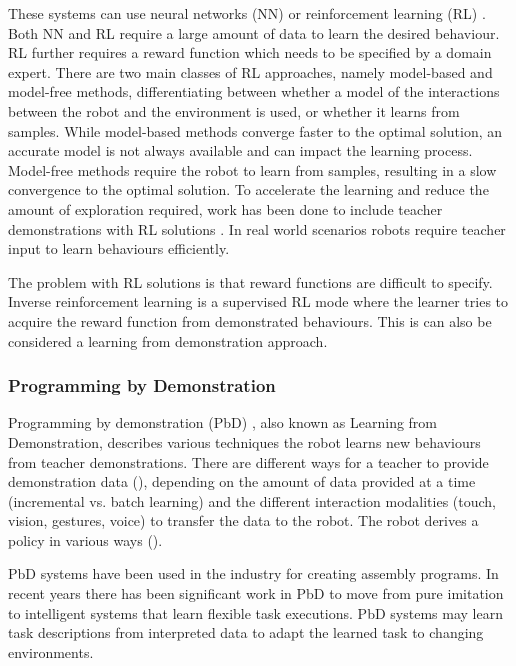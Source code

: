 These systems can use neural networks (NN) \cite{billard2001robust} or reinforcement learning (RL) \cite{sutton1998reinforcement,kaelbling1996reinforcement,gosavi2009reinforcement}. Both NN and RL require a large amount of data to learn the desired behaviour. 
RL further requires a reward function which needs to be specified by a domain expert.
There are two main classes of RL approaches, namely model-based \cite{polydoros2017survey} and model-free \cite{kober2013reinforcement} methods, differentiating between whether a model of the interactions between the robot and the environment is used, or whether it learns from samples.
While model-based methods converge faster to the optimal solution, an accurate model is not always available and can impact the learning process.
Model-free methods require the robot to learn from samples, resulting in a slow convergence to the optimal solution.
To accelerate the learning and reduce the amount of exploration required, work has been done to include teacher demonstrations with RL solutions \cite{martinez2017relational,hester2017learning}.
In real world scenarios robots require teacher input to learn behaviours efficiently. 

The problem with RL solutions is that reward functions are difficult to specify.
Inverse reinforcement learning \cite{abbeel2011inverse} is a supervised RL mode where the learner tries to acquire the reward function from demonstrated behaviours.
This is can also be considered a learning from demonstration approach.

\subsubsection{Programming by Demonstration}
Programming by demonstration (PbD) \cite{billard2008robot}, also known as Learning from Demonstration, describes various techniques the robot learns new behaviours from teacher demonstrations. 
There are different ways for a teacher to provide demonstration data (), depending on the amount of data provided at a time (incremental vs. batch learning) and the different interaction modalities (touch, vision, gestures, voice) to transfer the data to the robot. 
The robot derives a policy in various ways (). 

PbD systems have been used in the industry for creating assembly programs. 
In recent years there has been significant work in PbD to move from pure imitation to intelligent systems that learn flexible task executions. 
PbD systems may learn task descriptions from interpreted data to adapt the learned task to changing environments.

